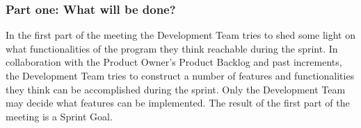 \subsubsection{Part one: What will be done?}


In the first part of the meeting the Development Team tries to shed some light on what 
functionalities of the program they think reachable during the sprint\cite{scrumguide11}. In 
collaboration with the Product Owner's Product Backlog and past increments, the Development 
Team tries to construct a number of features and functionalities they think can be 
accomplished during the sprint. Only the Development Team may decide what features can be 
implemented. The result of the first part of the meeting is a Sprint Goal\cite{scrumguide11}.
